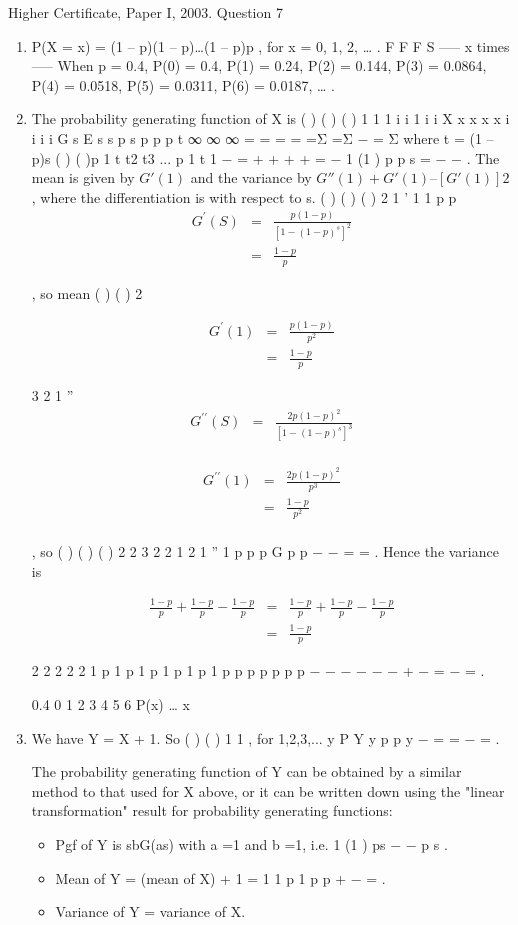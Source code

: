 \documentclass[a4paper,12pt]{article}
\begin{document}
Higher Certificate, Paper I, 2003. Question 7
\begin{enumerate}
\item P(X = x) = (1 – p)(1 – p)…(1 – p)p , for x = 0, 1, 2, … .
F F F S
----- x times -----
  When p = 0.4, P(0) = 0.4, P(1) = 0.24, P(2) = 0.144, P(3) = 0.0864,
P(4) = 0.0518, P(5) = 0.0311, P(6) = 0.0187, … .
\item The probability generating function of X is
( ) ( ) ( )
1 1 1
i i 1 i i X x x x x
i
i i i
G s E s s p s p p p t
∞ ∞ ∞
= = =
  = =Σ =Σ − = Σ where t = (1 – p)s
( ) ( )p 1 t t2 t3 ... p 1 t 1 − = + + + + = −
1 (1 )
p
p s
=
  − −
.
The mean is given by $G'(1)$ and the variance by $G''(1) + G'(1) – [G'(1)]2$, where
the differentiation is with respect to s.
( ) ( )
{ ( ) }2
1
'
1 1
p p
\begin{eqnarray*} 
G^{\prime}(S) 
&=& \frac{p(1-p)}{[1-(1-p)^s]^2} \\
&=& \frac{1-p}{p}
\end{eqnarray*}


, so mean ( ) ( )
2


\begin{eqnarray*} 
G^{\prime}(1) 
&=& \frac{p(1-p)}{p^2} \\
&=& \frac{1-p}{p}
\end{eqnarray*}

3
2 1
''
\begin{eqnarray*} 
G^{\prime\prime}(S) 
&=& \frac{2p(1-p)^2}{[1-(1-p)^s]^3} \\
\end{eqnarray*}


\begin{eqnarray*} 
G^{\prime\prime}(1) 
&=& \frac{2p(1-p)^2}{p^3} \\
&=& \frac{1-p}{p^2}\\
\end{eqnarray*}

, so ( ) ( ) ( ) 2 2
3 2
2 1 2 1
'' 1
p p p
G
p p
− −
= = .
Hence the variance is 

\begin{eqnarray*} 
\frac{1-p}{p} + \frac{1-p}{p} - \frac{1-p}{p} 
&=& \frac{1-p}{p} + \frac{1-p}{p} - \frac{1-p}{p}\\
&=& \frac{1-p}{p}
\end{eqnarray*}


2 2 2 2
2 1 p 1 p 1 p 1 p 1 p 1 p
p p p p p p
− − − − − − + − = − = .

0.4
0 1 2 3 4 5 6
P(x)
…
x
\item We have Y = X + 1.
So ( ) ( ) 1 1 , for 1,2,3,... y P Y y p p y − = = − = .

The probability generating function of Y can be obtained by a similar method
to that used for X above, or it can be written down using the "linear
transformation" result for probability generating functions:
\begin{itemize}
\item 
Pgf of Y is sbG(as) with a =1 and b =1, i.e. 1 (1 )
ps
− − p s
.
\item Mean of Y = (mean of X) + 1 = 1 1 p 1
p p
+ − = .
\item Variance of Y = variance of X.
\end{itemize}
\end{enumerate}
\end{document}
